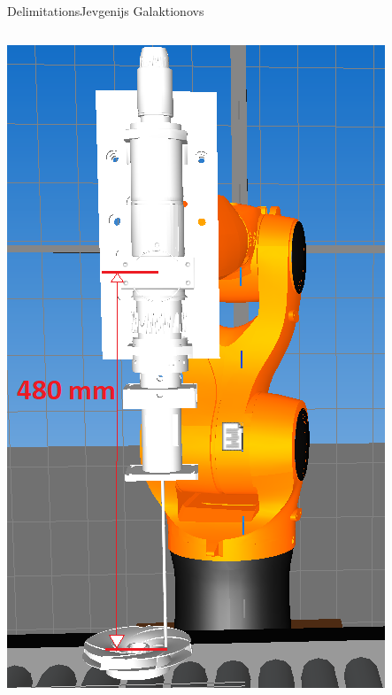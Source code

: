 \begin{frame}{Delimitations}{Jevgenijs Galaktionovs}
\begin{columns}
{\includegraphics[scale=0.22]{graphics/eugene/focal_length480b}}

\end{columns}
\end{frame}

